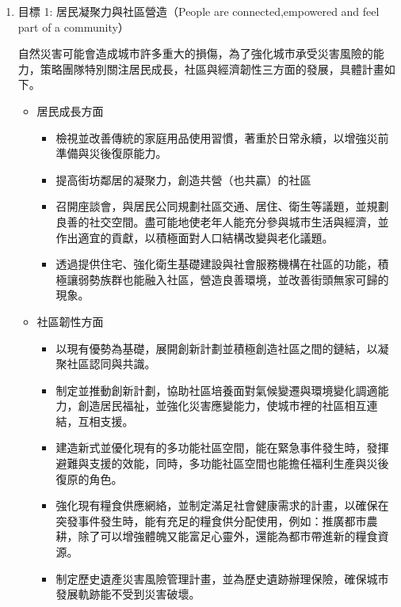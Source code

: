 \documentclass[a4paper,12pt]{article}
\begin{document}
\begin{enumerate}
\begin{enumerate}
\begin{enumerate}
\item 目標 1: 居民凝聚力與社區營造（People are connected,empowered and feel part of a community）
\label{sec:orgd8c562b}

自然災害可能會造成城市許多重大的損傷，為了強化城市承受災害風險的能力，策略團隊特別關注居民成長，社區與經濟韌性三方面的發展，具體計畫如下。\\
\begin{itemize}
\item 居民成長方面
\label{sec:orgd4f23ba}
\begin{itemize}
\item 檢視並改善傳統的家庭用品使用習慣，著重於日常永續，以增強災前準備與災後復原能力。\\
\item 提高街坊鄰居的凝聚力，創造共營（也共贏）的社區\\
\item 召開座談會，與居民公同規劃社區交通、居住、衛生等議題，並規劃良善的社交空間。盡可能地使老年人能充分參與城市生活與經濟，並作出適宜的貢獻，以積極面對人口結構改變與老化議題。\\
\item 透過提供住宅、強化衛生基礎建設與社會服務機構在社區的功能，積極讓弱勢族群也能融入社區，營造良善環境，並改善街頭無家可歸的現象。\\
\end{itemize}
\item 社區韌性方面
\label{sec:org3862c2c}
\begin{itemize}
\item 以現有優勢為基礎，展開創新計劃並積極創造社區之間的鏈結，以凝聚社區認同與共識。\\
\item 制定並推動創新計劃，協助社區培養面對氣候變遷與環境變化調適能力，創造居民福祉，並強化災害應變能力，使城市裡的社區相互連結，互相支援。\\
\item 建造新式並優化現有的多功能社區空間，能在緊急事件發生時，發揮避難與支援的效能，同時，多功能社區空間也能擔任福利生產與災後復原的角色。\\
\item 強化現有糧食供應網絡，並制定滿足社會健康需求的計畫，以確保在突發事件發生時，能有充足的糧食供分配使用，例如：推廣都市農耕，除了可以增強體魄又能富足心靈外，還能為都市帶進新的糧食資源。\\
\item 制定歷史遺產災害風險管理計畫，並為歷史遺跡辦理保險，確保城市發展軌跡能不受到災害破壞。\\

\end{itemize}
\end{itemize}
\end{enumerate}
\end{enumerate}
\end{enumerate}
\end{document}
